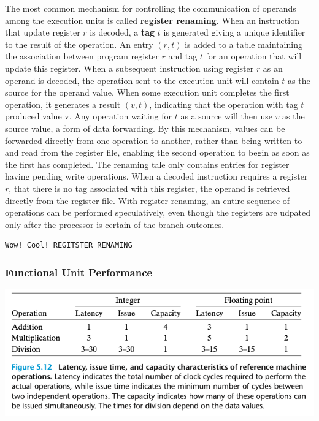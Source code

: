 \documentclass[11pt]{article}
\begin{document}
The most common mechanism for controlling the communication of operands among the execution units is called \textbf{register renaming}. When an instruction that update register \(r\) is decoded, a \textbf{tag} \(t\) is generated giving a unique identifier to the result of the operation. An entry \((r,t)\) is added to a table maintaining the association between program register \(r\) and tag \(t\) for an operation that will update this register. When a subsequent instruction using register \(r\) as an operand is decoded, the operation sent to the execution unit will contain \(t\) as the source for the operand value. When some execution unit completes the first operation, it generates a result \((v,t)\), indicating that the operation with tag \(t\) produced value v. Any operation waiting for \(t\) as a source will then use \(v\) as the source value, a form of data forwarding. By this mechanism, values can be forwarded directly from one operation to another, rather than being written to and read from the register file, enabling the second operation to begin as soon as the first has completed. The renaming tale only contains entries for register having pending write operations. When a decoded instruction requires a register \(r\), that there is no tag associated with this register, the operand is retrieved directly from the register file. With register renaming, an entire sequence of operations can be performed speculatively, even though the registers are udpated only after the processor is certain of the branch outcomes.\\
\begin{verbatim}
Wow! Cool! REGITSTER RENAMING
\end{verbatim}

\subsubsection{Functional Unit Performance}
\label{sec:org3c17d0b}

\begin{center}
\includegraphics[width=.9\linewidth]{pics/figure5.12-latency-issue-time-and-capacity-characteristics.png}
\end{center}
\end{document}
